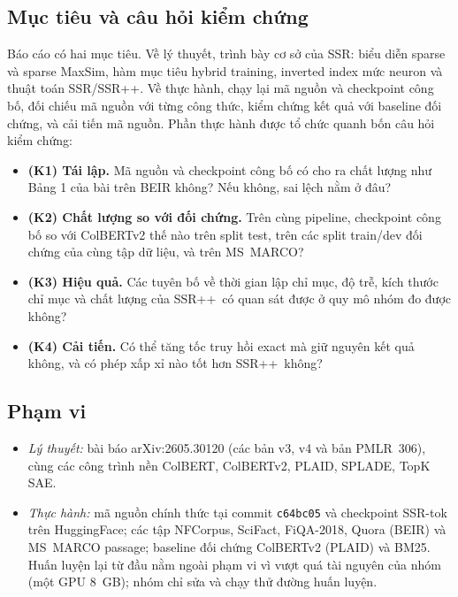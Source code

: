 \documentclass[a4paper,13pt]{extreport}
\theoremstyle{plain}
\newcommand{\ssr}{SSR}
\newcommand{\ssrpp}{SSR++}
\begin{document}
\subsection{Mục tiêu và câu hỏi kiểm chứng}
Báo cáo có hai mục tiêu. Về lý thuyết, trình bày cơ sở của \ssr: biểu diễn sparse và sparse MaxSim, hàm mục tiêu hybrid training, inverted index mức neuron và thuật toán \ssr/\ssrpp. Về thực hành, chạy lại mã nguồn và checkpoint công bố, đối chiếu mã nguồn với từng công thức, kiểm chứng kết quả với baseline đối chứng, và cải tiến mã nguồn. Phần thực hành được tổ chức quanh bốn câu hỏi kiểm chứng:
\begin{itemize}[leftmargin=1.5cm]
  \item \textbf{(K1) Tái lập.} Mã nguồn và checkpoint công bố có cho ra chất lượng như Bảng 1 của bài trên BEIR không? Nếu không, sai lệch nằm ở đâu?
  \item \textbf{(K2) Chất lượng so với đối chứng.} Trên cùng pipeline, checkpoint công bố so với ColBERTv2 thế nào trên split test, trên các split train/dev đối chứng của cùng tập dữ liệu, và trên MS~MARCO?
  \item \textbf{(K3) Hiệu quả.} Các tuyên bố về thời gian lập chỉ mục, độ trễ, kích thước chỉ mục và chất lượng của \ssrpp\ có quan sát được ở quy mô nhóm đo được không?
  \item \textbf{(K4) Cải tiến.} Có thể tăng tốc truy hồi exact mà giữ nguyên kết quả không, và có phép xấp xỉ nào tốt hơn \ssrpp\ không?
\end{itemize}

\subsection{Phạm vi}
\begin{itemize}[leftmargin=1.5cm]
  \item \emph{Lý thuyết:} bài báo arXiv:2605.30120 (các bản v3, v4 và bản PMLR~306), cùng các công trình nền ColBERT, ColBERTv2, PLAID, SPLADE, TopK SAE.
  \item \emph{Thực hành:} mã nguồn chính thức tại commit \texttt{c64bc05} và checkpoint \ssr-tok trên HuggingFace; các tập NFCorpus, SciFact, FiQA-2018, Quora (BEIR) và MS~MARCO passage; baseline đối chứng ColBERTv2 (PLAID) và BM25. Huấn luyện lại từ đầu nằm ngoài phạm vi vì vượt quá tài nguyên của nhóm (một GPU 8~GB); nhóm chỉ sửa và chạy thử đường huấn luyện.
\end{itemize}
\end{document}
